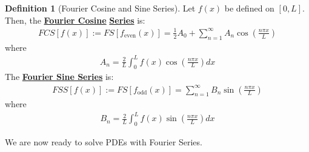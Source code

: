 \documentclass[11pt]{scrartcl}
\theoremstyle{definition}
\newtheorem{definition}{Definition}
\theoremstyle{remark}
\newcommand{\dfn}[1]{\textbf{\underline{#1}}}
\newcommand{\idx}[2]{\int_{#1}^{#2}}
\begin{document}
\begin{definition}[Fourier Cosine and Sine Series]
	Let $f(x)$ be defined on $[0,L]$. Then, the \dfn{Fourier Cosine} \dfn{Series} is:
	\begin{align}
	FCS[f(x)] := FS[f_{\text{even}} (x)] = \frac{1}{2} A_0 + \sum_{n=1}^\infty A_n \cos \left( \frac{n \pi x}{L} \right) 	
	\end{align}
	where
	\begin{align}
		A_n = \frac{2}{L} \idx{0}{L} f(x) \cos \left( \frac{n \pi x}{L} \right) dx 	
	\end{align}
	The \dfn{Fourier Sine Series} is: 
	\begin{align*}
		FSS[f(x)] := FS [ f_{\text{odd}} (x)] = \sum_{n=1}^\infty B_n \sin \left( \frac{n \pi x}{L} \right) 
	\end{align*}
	where
	\begin{align}
		B_n = \frac{2}{L} \idx{0}{L} f(x) \sin \left( \frac{n \pi x}{L} \right) dx 	
	\end{align}
\end{definition}
We are now ready to solve PDEs with Fourier Series. 
\end{document}
